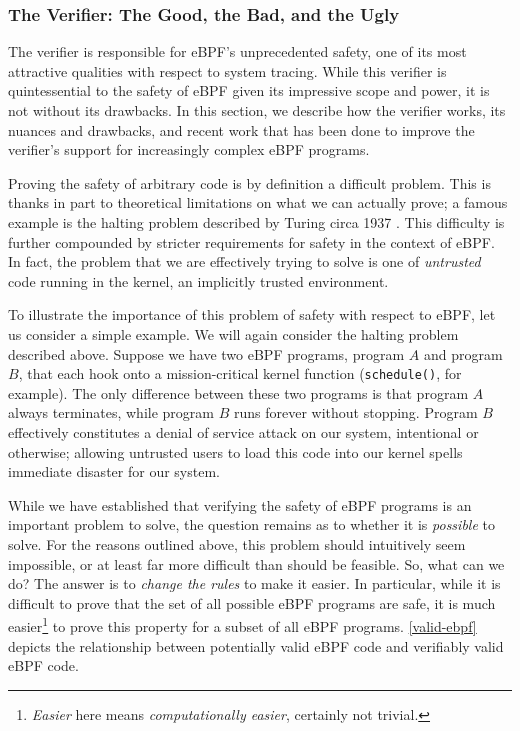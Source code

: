 \documentclass[
  12pt]{findlay}
\newcommand{\passthrough}[1]{#1}
\begin{document}
\FloatBarrier

\hypertarget{the-verifier-the-good-the-bad-and-the-ugly}{%
\subsubsection{The Verifier: The Good, the Bad, and the
Ugly}\label{the-verifier-the-good-the-bad-and-the-ugly}}

\label{verifier-section}

The verifier is responsible for eBPF's unprecedented safety, one of its
most attractive qualities with respect to system tracing. While this
verifier is quintessential to the safety of eBPF given its impressive
scope and power, it is not without its drawbacks. In this section, we
describe how the verifier works, its nuances and drawbacks, and recent
work that has been done to improve the verifier's support for
increasingly complex eBPF programs.

Proving the safety of arbitrary code is by definition a difficult
problem. This is thanks in part to theoretical limitations on what we
can actually prove; a famous example is the halting problem described by
Turing circa 1937 \autocite{turing37}. This difficulty is further
compounded by stricter requirements for safety in the context of eBPF.
In fact, the problem that we are effectively trying to solve is one of
\emph{untrusted} code running in the kernel, an implicitly trusted
environment.

To illustrate the importance of this problem of safety with respect to
eBPF, let us consider a simple example. We will again consider the
halting problem described above. Suppose we have two eBPF programs,
program \(A\) and program \(B\), that each hook onto a mission-critical
kernel function (\passthrough{\lstinline!schedule()!}, for example). The
only difference between these two programs is that program \(A\) always
terminates, while program \(B\) runs forever without stopping. Program
\(B\) effectively constitutes a denial of service attack
\autocite{hussain03} on our system, intentional or otherwise; allowing
untrusted users to load this code into our kernel spells immediate
disaster for our system.

While we have established that verifying the safety of eBPF programs is
an important problem to solve, the question remains as to whether it is
\emph{possible} to solve. For the reasons outlined above, this problem
should intuitively seem impossible, or at least far more difficult than
should be feasible. So, what can we do? The answer is to \emph{change
the rules} to make it easier. In particular, while it is difficult to
prove that the set of all possible eBPF programs are safe, it is much
easier\footnote{\emph{Easier}
here means \emph{computationally easier}, certainly not trivial.} to
prove this property for a subset of all eBPF programs.
\autoref{valid-ebpf} depicts the relationship between potentially valid
eBPF code and verifiably valid eBPF code.
\end{document}
